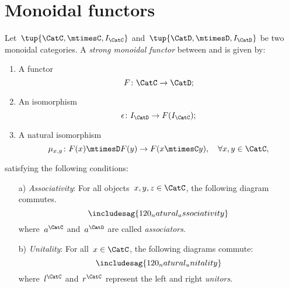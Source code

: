 

\section{Monoidal functors}
\label{sec:monoidal-functors}
\begin{ctdefinition}
  \label{def:strong-monoidal-functor}

  Let~$\tup{\CatC,\mtimesC,I_\CatC}$ and~$\tup{\CatD,\mtimesD,I_\CatD}$ be two monoidal categories. A \emph{strong monoidal functor} between \CatC and \CatD is given by:
  \begin{enumerate}
    \item A functor
    \begin{equation}
      F\colon \CatC\to \CatD;
    \end{equation}
    \item An isomorphism
    \begin{equation}
      \epsilon\colon I_\CatD\to F(I_\CatC);
    \end{equation}
    \item A natural isomorphism
    \begin{equation}
      \mu_{x,y}\colon F(x)\mtimesD F(y) \to F(x\mtimesC y),\quad \forall x,y\in \CatC,
    \end{equation}
  \end{enumerate}
  satisfying the following conditions:
  \begin{enumerate}
    \item[a)] \emph{Associativity}: For all objects~$x,y,z\in \CatC$, the following diagram commutes.
    \begin{equation}
      \includesag{120_natural_associativity}
    \end{equation}
    where~$a^\CatC$ and~$a^\CatD$ are called \emph{associators}.
    \item[b)] \emph{Unitality}: For all~$x\in \CatC$, the following diagrams commute:
    \begin{equation}
      \includesag{120_natural_unitality}
    \end{equation}
    where~$l^\CatC$ and~$r^\CatC$ represent the left and right \emph{unitors}.
  \end{enumerate}
\end{ctdefinition}


